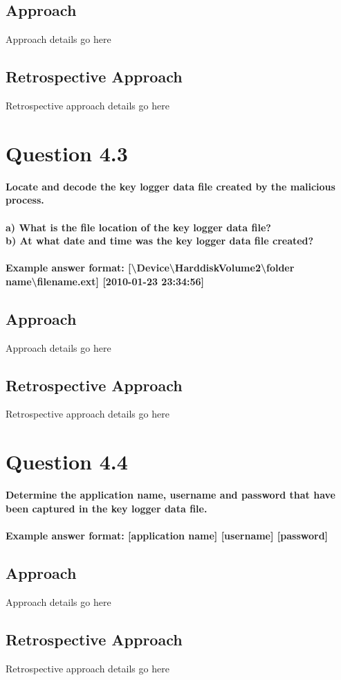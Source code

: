 \subsection{Approach}
Approach details go here
\subsection{Retrospective Approach}
Retrospective approach details go here

\section{Question 4.3}
\textbf{Locate and decode the key logger data file created by the malicious
process.\\
\\a) What is the file location of the key logger data file?
\\b) At what date and time was the key logger data file created?
\\\\
Example answer format:
[\textbackslash{}Device\textbackslash{}HarddiskVolume2\textbackslash{}folder
name\textbackslash{}filename.ext] [2010-01-23 23:34:56]}
\subsection{Approach}
Approach details go here
\subsection{Retrospective Approach}
Retrospective approach details go here

\section{Question 4.4}
\textbf{Determine the application name, username and password that have been
captured in the key logger data file.
\\\\
Example answer format: [application name] [username] [password]}
\subsection{Approach}
Approach details go here
\subsection{Retrospective Approach}
Retrospective approach details go here

